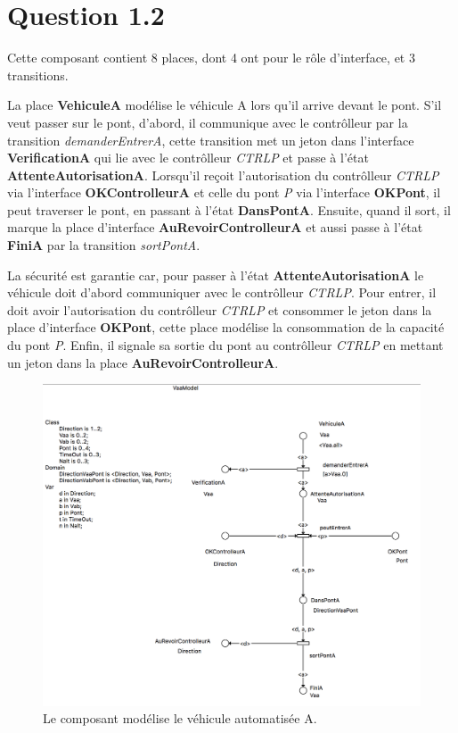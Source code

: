 \documentclass[a4paper,11pt]{report}
\begin{document}
\section{Question 1.2}
	Cette composant contient 8 places, dont 4 ont pour le rôle d'interface, et 3 transitions.
	
	La place \textbf{VehiculeA} modélise le véhicule A  lors qu'il arrive devant le pont. S'il veut passer sur le pont, d'abord, il communique avec le contrôlleur par la transition \textit{demanderEntrerA}, cette transition met un jeton dans l'interface \textbf{VerificationA} qui lie avec le contrôlleur \textit{CTRLP} et passe à l'état \textbf{AttenteAutorisationA}. Lorsqu'il reçoit l'autorisation du contrôlleur \textit{CTRLP} via l'interface \textbf{OKControlleurA} et celle du pont \textit{P} via l'interface \textbf{OKPont}, il peut traverser le pont, en passant à l'état \textbf{DansPontA}. Ensuite, quand il sort, il marque la place d'interface \textbf{AuRevoirControlleurA} et aussi passe à l'état \textbf{FiniA} par la transition \textit{sortPontA}.
	
	La sécurité est garantie car, pour passer à l'état \textbf{AttenteAutorisationA} le véhicule doit d'abord communiquer avec le contrôlleur \textit{CTRLP}. Pour entrer, il doit avoir l'autorisation du contrôlleur \textit{CTRLP} et consommer le jeton dans la place d'interface \textbf{OKPont},  cette place modélise la consommation de la capacité du pont \textit{P}. Enfin, il signale sa sortie du pont au contrôlleur \textit{CTRLP} en mettant un jeton dans la place \textbf{AuRevoirControlleurA}.

	\begin{figure}[!htbp]
		\centering
		\includegraphics[width = 15cm]{vaaModel.png}
		\caption{Le composant modélise le véhicule automatisée A.}
	\end{figure}
	\newpage
	
\end{document}
